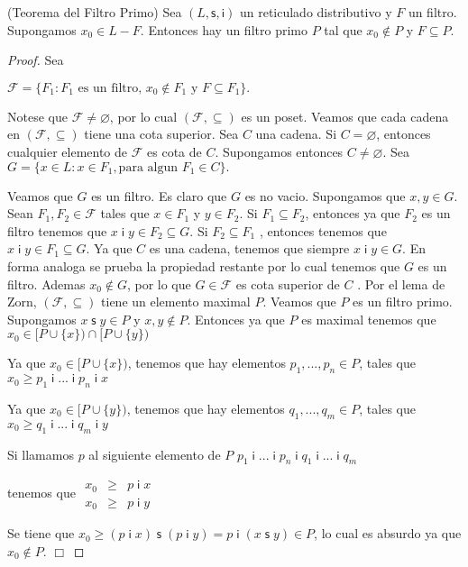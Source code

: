   \begin{theorem}
    (Teorema del Filtro Primo) Sea \((L,\mathsf{s},\mathsf{i})\) un reticulado distributivo y \(F\) un filtro. Supongamos \(x_{0}\in L-F\). Entonces hay un filtro primo \(P\) tal que \(x_{0}\notin P\) y \(F\subseteq P\).
  \end{theorem}
  \begin{proof}
    Sea

    \(\displaystyle \mathcal{F}=\{F_{1}:F_{1}\text{ es un filtro, }x_{0}\notin F_{1}\text{ y } F\subseteq F_{1}\}. \)

    Notese que \(\mathcal{F}\neq \varnothing \), por lo cual \((\mathcal{F},\subseteq )\) es un poset. Veamos que cada cadena en \((\mathcal{F},\subseteq )\) tiene una cota superior. Sea \(C\) una cadena. Si \(C=\varnothing \), entonces cualquier elemento de \(\mathcal{F}\) es cota de \(C\). Supongamos entonces \(C\neq \varnothing \). Sea
    \(\displaystyle G=\{x\in L:x\in F_{1},\text{para algun }F_{1}\in C\}. \)

    Veamos que \(G\) es un filtro. Es claro que \(G\) es no vacio. Supongamos que \( x,y\in G\). Sean \(F_{1},F_{2}\in \mathcal{F}\) tales que \(x\in F_{1}\) y \(y\in F_{2}\). Si \(F_{1}\subseteq F_{2}\), entonces ya que \(F_{2}\) es un filtro tenemos que \(x\;\mathsf{i\;}y\in F_{2}\subseteq G\). Si \(F_{2}\subseteq F_{1}\) , entonces tenemos que \(x\;\mathsf{i\;}y\in F_{1}\subseteq G\). Ya que \(C\) es una cadena, tenemos que siempre \(x\;\mathsf{i\;}y\in G\). En forma analoga se prueba la propiedad restante por lo cual tenemos que \(G\) es un filtro. Ademas \(x_{0}\notin G\), por lo que \(G\in \mathcal{F}\) es cota superior de \(C\) . Por el lema de Zorn, \((\mathcal{F},\subseteq )\) tiene un elemento maximal \( P\). Veamos que \(P\) es un filtro primo. Supongamos \(x\;\mathsf{s\;}y\in P\) y \( x,y\notin P\). Entonces ya que \(P\) es maximal tenemos que
    \(\displaystyle x_{0}\in \lbrack P\cup \{x\})\cap \lbrack P\cup \{y\}) \)

    Ya que \(x_{0}\in \lbrack P\cup \{x\})\), tenemos que hay elementos \( p_{1},...,p_{n}\in P\), tales que
    \(\displaystyle x_{0}\geq p_{1}\;\mathsf{i\;}...\;\mathsf{i\;}p_{n}\;\mathsf{i\;}x \)

    Ya que \(x_{0}\in \lbrack P\cup \{y\})\), tenemos que hay elementos \( q_{1},...,q_{m}\in P\), tales que
    \(\displaystyle x_{0}\geq q_{1}\;\mathsf{i\;}...\;\mathsf{i\;}q_{m}\;\mathsf{i\;}y \)

    Si llamamos \(p\) al siguiente elemento de \(P\)
    \(\displaystyle p_{1}\;\mathsf{i\;}...\;\mathsf{i\;}p_{n}\;\mathsf{i\;}q_{1}\;\mathsf{i\;} ...\;\mathsf{i\;}q_{m} \)

    tenemos que
    \(\displaystyle \begin{array}{rcl} x_{0} & \geq & p\;\mathsf{i\;}x \\ x_{0} & \geq & p\;\mathsf{i\;}y \end{array} \)

    Se tiene que \(x_{0}\geq (p\;\mathsf{i\;}x)\;\mathsf{s\;}(p\;\mathsf{i\;} y)=p\;\mathsf{i\;}(x\;\mathsf{s\;}y)\in P\), lo cual es absurdo ya que \( x_{0}\notin P\). \(\Box\)
  \end{proof}

